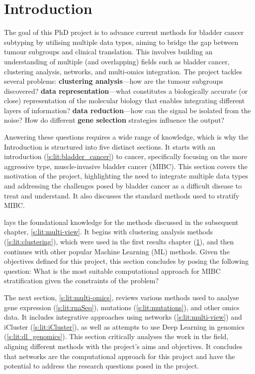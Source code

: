 

\chapter{Introduction}


The goal of this PhD project is to advance current methods for bladder cancer subtyping by utilising multiple data types, aiming to bridge the gap between tumour subgroups and clinical translation. This involves building an understanding of multiple (and overlapping) fields such as bladder cancer, clustering analysis, networks, and multi-omics integration. The project tackles several problems: \textbf{clustering analysis}—how are the tumour subgroups discovered? \textbf{data representation}—what constitutes a biologically accurate (or close) representation of the molecular biology that enables integrating different layers of information? \textbf{data reduction}—how can the signal be isolated from the noise? How do different \textbf{gene selection} strategies influence the output?

Answering these questions requires a wide range of knowledge, which is why the Introduction is structured into five distinct sections. It starts with an introduction (\cref{s:lit:bladder_cancer}) to cancer, specifically focusing on the more aggressive type, muscle-invasive bladder cancer (MIBC). This section covers the motivation of the project, highlighting the need to integrate multiple data types and addressing the challenges posed by bladder cancer as a difficult disease to treat and understand. It also discusses the standard methods used to stratify MIBC.

 lays the foundational knowledge for the methods discussed in the subsequent chapter, \cref{s:lit:multi-view}. It begins with clustering analysis methods (\cref{s:lit:clustering}), which were used in the first results chapter (\ref{}), and then continues with other popular Machine Learning (ML) methods. Given the objectives defined for this project, this section concludes by posing the following question: What is the most suitable computational approach for MIBC stratification given the constraints of the problem?

The next section, \cref{s:lit:multi-omics}, reviews various methods used to analyse gene expression (\cref{s:lit:rnaSeq}), mutations (\cref{s:lit:mutations}), and other omics data. It includes integrative approaches using networks (\cref{s:lit:multi-view}) and iCluster (\cref{s:lit:iCluster}), as well as attempts to use Deep Learning in genomics (\cref{s:lit:dl_genomics}). This section critically analyses the work in the field, aligning different methods with the project's aims and objectives. It concludes that networks are the computational approach for this project and have the potential to address the research questions posed in the project.

